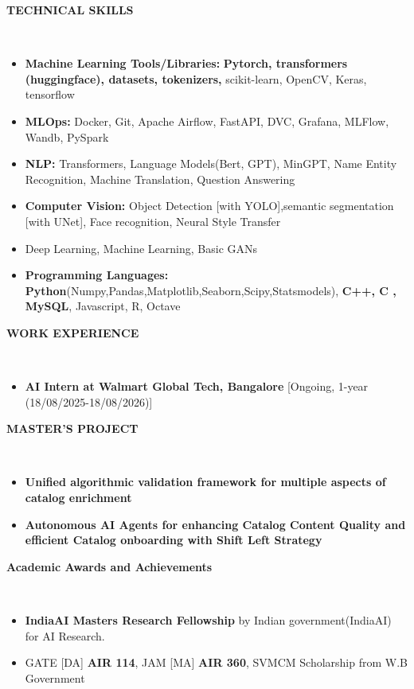 \documentclass[a4paper,10pt]{article}
\newcommand{\lsep}{-0.5cm}
\newcommand{\resheading}[1]{{\small \colorbox{mygrey}{\begin{minipage}{0.975\textwidth}{\textbf{#1 \vphantom{p\^{E}}}}\end{minipage}}}}
\begin{document}
\resheading{\textbf{TECHNICAL SKILLS} }\\[\lsep]
\begin{itemize}
\setlength\itemsep{0em}

\item \textbf{Machine Learning Tools/Libraries: } \textbf{Pytorch, transformers (huggingface), datasets, tokenizers,} scikit-learn, OpenCV, Keras, tensorflow

\item \textbf{MLOps: } Docker, Git, Apache Airflow, FastAPI, DVC, Grafana, MLFlow, Wandb, PySpark
\item \textbf{NLP:} Transformers, Language Models(Bert, GPT), MinGPT, Name Entity Recognition, Machine Translation, Question Answering 
\item \textbf{Computer Vision:} Object Detection [with YOLO],semantic segmentation [with UNet], Face recognition, Neural Style Transfer
\item Deep Learning, Machine Learning, Basic GANs
\item \textbf{Programming Languages: } \textbf{Python}(Numpy,Pandas,Matplotlib,Seaborn,Scipy,Statsmodels),
\textbf{C++, C , MySQL}, Javascript, R, Octave
\end{itemize}

\resheading{\textbf{WORK EXPERIENCE} }\\[\lsep]
\begin{itemize}
\item \textbf{AI Intern at Walmart Global Tech, Bangalore} [Ongoing, 1-year (18/08/2025-18/08/2026)]
\end{itemize}

\resheading{\textbf{MASTER'S PROJECT} }\\[\lsep]
\begin{itemize}
\setlength\itemsep{0.1em}
\item \textbf{Unified algorithmic validation framework for multiple aspects of catalog enrichment}
\item \textbf{Autonomous AI Agents for enhancing Catalog Content Quality and efficient Catalog onboarding with Shift Left Strategy}
\end{itemize}

\resheading{\textbf{Academic Awards and Achievements} }\\[\lsep]
\begin{itemize}
\item \textbf{IndiaAI Masters Research Fellowship} by Indian government(IndiaAI) for AI Research.
\item GATE [DA] \textbf{AIR 114}, JAM [MA] \textbf{AIR 360}, SVMCM Scholarship from W.B Government
\end{itemize}
\end{document}
